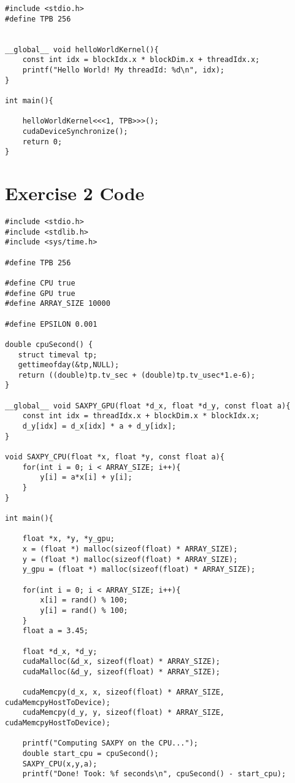 \documentclass[english]{exam}
\begin{document}
\begin{lstlisting}[style=CStyle]
#include <stdio.h>
#define TPB 256


__global__ void helloWorldKernel(){
	const int idx = blockIdx.x * blockDim.x + threadIdx.x;
	printf("Hello World! My threadId: %d\n", idx);
}

int main(){

	helloWorldKernel<<<1, TPB>>>();
	cudaDeviceSynchronize();
	return 0;
}

\end{lstlisting}

\section*{Exercise 2 Code}

\begin{lstlisting}[style=CStyle]
#include <stdio.h>
#include <stdlib.h>
#include <sys/time.h>

#define TPB 256

#define CPU true
#define GPU true
#define ARRAY_SIZE 10000

#define EPSILON 0.001

double cpuSecond() {
   struct timeval tp;
   gettimeofday(&tp,NULL);
   return ((double)tp.tv_sec + (double)tp.tv_usec*1.e-6);
}

__global__ void SAXPY_GPU(float *d_x, float *d_y, const float a){
	const int idx = threadIdx.x + blockDim.x * blockIdx.x;
	d_y[idx] = d_x[idx] * a + d_y[idx];
}

void SAXPY_CPU(float *x, float *y, const float a){
	for(int i = 0; i < ARRAY_SIZE; i++){
		y[i] = a*x[i] + y[i];
	}
}

int main(){

	float *x, *y, *y_gpu;
	x = (float *) malloc(sizeof(float) * ARRAY_SIZE);
	y = (float *) malloc(sizeof(float) * ARRAY_SIZE);
	y_gpu = (float *) malloc(sizeof(float) * ARRAY_SIZE);

	for(int i = 0; i < ARRAY_SIZE; i++){
		x[i] = rand() % 100;
		y[i] = rand() % 100;
	}
	float a = 3.45;
	
	float *d_x, *d_y;
	cudaMalloc(&d_x, sizeof(float) * ARRAY_SIZE);
	cudaMalloc(&d_y, sizeof(float) * ARRAY_SIZE);
	
	cudaMemcpy(d_x, x, sizeof(float) * ARRAY_SIZE, cudaMemcpyHostToDevice);
	cudaMemcpy(d_y, y, sizeof(float) * ARRAY_SIZE, cudaMemcpyHostToDevice);

	printf("Computing SAXPY on the CPU...");
	double start_cpu = cpuSecond();
	SAXPY_CPU(x,y,a);
	printf("Done! Took: %f seconds\n", cpuSecond() - start_cpu);


\end{lstlisting}
\end{document}
